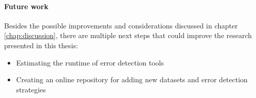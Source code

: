 \paragraph{Future work}
Besides the possible improvements and considerations discussed in chapter \ref{chap:discussion}, there are multiple next steps that could improve the research presented in this thesis:
\begin{itemize}
    \item Estimating the runtime of error detection tools
    \item Creating an online repository for adding new datasets and error detection strategies
\end{itemize}
